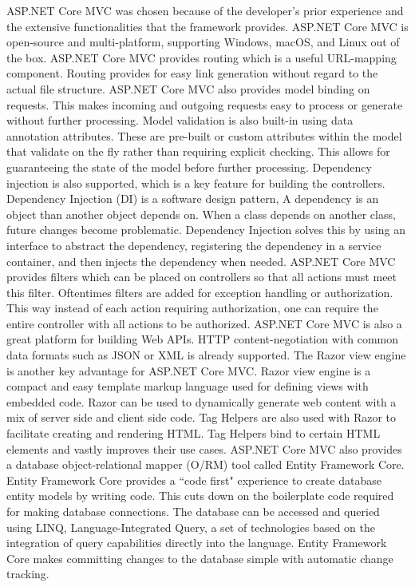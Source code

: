 ASP.NET Core MVC was chosen because of the developer's prior experience and the extensive functionalities that the framework provides. ASP.NET Core MVC is open-source and multi-platform, supporting Windows, macOS, and Linux out of the box. ASP.NET Core MVC provides routing which is a useful URL-mapping component. Routing provides for easy link generation without regard to the actual file structure. ASP.NET Core MVC also provides model   binding on requests. This makes incoming and outgoing requests easy to process or generate without further processing. Model validation is also built-in using data annotation attributes. These are pre-built or custom attributes within the model that validate on the fly rather than requiring explicit checking. This allows for guaranteeing the state of the model before further processing. Dependency injection is also supported, which is a key feature for building the controllers. Dependency Injection (DI) is a software design pattern,  A dependency is an object than another object depends on. When a class depends on another class, future changes become problematic. Dependency Injection solves this by using an interface to abstract the dependency, registering the dependency in a service container, and then injects the dependency when needed. ASP.NET Core MVC provides filters which can be placed on controllers so that all actions must meet this filter. Oftentimes filters are added for exception handling or authorization. This way instead of each action requiring authorization, one can require the entire controller with all actions to be authorized. ASP.NET Core MVC is also a great platform for building Web APIs. HTTP content-negotiation with common data formats such as JSON or XML is already supported. The Razor view engine is another key advantage for ASP.NET Core MVC. Razor view engine is a compact and easy template markup language used for defining views with embedded \C code. Razor can be used to dynamically generate web content with a mix of server side and client side code. Tag Helpers are also used with Razor to facilitate creating and rendering HTML. Tag Helpers bind to certain HTML elements and vastly improves their use cases. ASP.NET Core MVC also provides a database object-relational mapper (O/RM) tool called Entity Framework Core. Entity Framework Core provides a ``code first" experience to create database entity models by writing code. This cuts down on the boilerplate code required for making database connections. The database can be accessed and queried using LINQ, Language-Integrated Query, a set of technologies based on the integration of query capabilities directly into the \C language. Entity Framework Core makes committing changes to the database simple with automatic change tracking.

